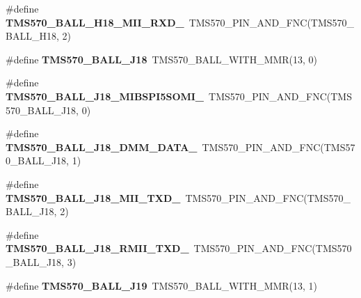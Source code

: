 \begin{DoxyCompactItemize}
\item 
\mbox{\label{tms570ls3137zwt-pins_8h_a8eb8339624855cdcc3491173de073e3b}} 
\#define {\bfseries T\+M\+S570\+\_\+\+B\+A\+L\+L\+\_\+\+H18\+\_\+\+M\+I\+I\+\_\+\+R\+X\+D\+\_}~T\+M\+S570\+\_\+\+P\+I\+N\+\_\+\+A\+N\+D\+\_\+\+F\+NC(T\+M\+S570\+\_\+\+B\+A\+L\+L\+\_\+\+H18, 2)
\item 
\mbox{\label{tms570ls3137zwt-pins_8h_a6406c338c5fa6798c5564ce501ab1080}} 
\#define {\bfseries T\+M\+S570\+\_\+\+B\+A\+L\+L\+\_\+\+J18}~T\+M\+S570\+\_\+\+B\+A\+L\+L\+\_\+\+W\+I\+T\+H\+\_\+\+M\+MR(13, 0)
\item 
\mbox{\label{tms570ls3137zwt-pins_8h_ac23f4f93cb13823fc0f1effea13c0ec9}} 
\#define {\bfseries T\+M\+S570\+\_\+\+B\+A\+L\+L\+\_\+\+J18\+\_\+\+M\+I\+B\+S\+P\+I5\+S\+O\+M\+I\+\_}~T\+M\+S570\+\_\+\+P\+I\+N\+\_\+\+A\+N\+D\+\_\+\+F\+NC(T\+M\+S570\+\_\+\+B\+A\+L\+L\+\_\+\+J18, 0)
\item 
\mbox{\label{tms570ls3137zwt-pins_8h_a3f96e17a658b98a4e20580390d89da7e}} 
\#define {\bfseries T\+M\+S570\+\_\+\+B\+A\+L\+L\+\_\+\+J18\+\_\+\+D\+M\+M\+\_\+\+D\+A\+T\+A\+\_}~T\+M\+S570\+\_\+\+P\+I\+N\+\_\+\+A\+N\+D\+\_\+\+F\+NC(T\+M\+S570\+\_\+\+B\+A\+L\+L\+\_\+\+J18, 1)
\item 
\mbox{\label{tms570ls3137zwt-pins_8h_a30ad5718a728faeedd6203593bb03627}} 
\#define {\bfseries T\+M\+S570\+\_\+\+B\+A\+L\+L\+\_\+\+J18\+\_\+\+M\+I\+I\+\_\+\+T\+X\+D\+\_}~T\+M\+S570\+\_\+\+P\+I\+N\+\_\+\+A\+N\+D\+\_\+\+F\+NC(T\+M\+S570\+\_\+\+B\+A\+L\+L\+\_\+\+J18, 2)
\item 
\mbox{\label{tms570ls3137zwt-pins_8h_a20bd56f4b9cd52e1e5d6dc66ded7cb92}} 
\#define {\bfseries T\+M\+S570\+\_\+\+B\+A\+L\+L\+\_\+\+J18\+\_\+\+R\+M\+I\+I\+\_\+\+T\+X\+D\+\_}~T\+M\+S570\+\_\+\+P\+I\+N\+\_\+\+A\+N\+D\+\_\+\+F\+NC(T\+M\+S570\+\_\+\+B\+A\+L\+L\+\_\+\+J18, 3)
\item 
\mbox{\label{tms570ls3137zwt-pins_8h_a3f2431d143956eb49d77ca9b8ff714ad}} 
\#define {\bfseries T\+M\+S570\+\_\+\+B\+A\+L\+L\+\_\+\+J19}~T\+M\+S570\+\_\+\+B\+A\+L\+L\+\_\+\+W\+I\+T\+H\+\_\+\+M\+MR(13, 1)
\item 

\end{DoxyCompactItemize}
